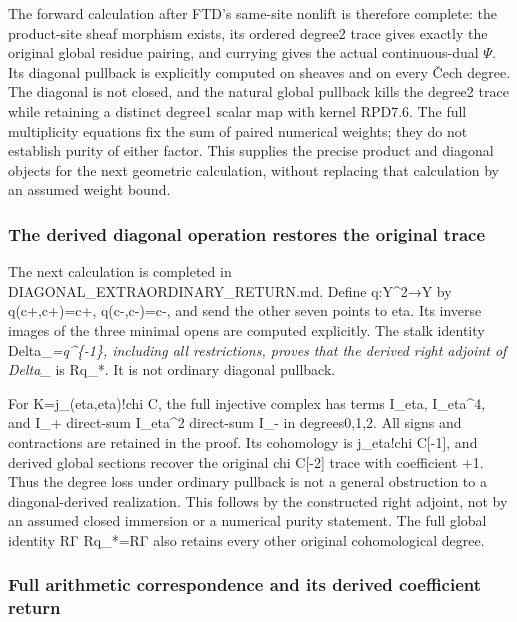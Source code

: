 The forward calculation after FTD's same-site nonlift is therefore
complete: the product-site sheaf morphism exists, its ordered degree2
trace gives exactly the original global residue pairing, and currying
gives the actual continuous-dual \(\Psi\). Its diagonal pullback is
explicitly computed on sheaves and on every Čech degree. The diagonal is
not closed, and the natural global pullback kills the degree2 trace
while retaining a distinct degree1 scalar map with kernel RPD7.6. The
full multiplicity equations fix the sum of paired numerical weights;
they do not establish purity of either factor. This supplies the precise
product and diagonal objects for the next geometric calculation, without
replacing that calculation by an assumed weight bound.

\subsubsection{The derived diagonal operation restores the original
trace}\label{the-derived-diagonal-operation-restores-the-original-trace}

The next calculation is completed in DIAGONAL\_EXTRAORDINARY\_RETURN.md.
Define q:Y\^{}2→Y by q(c+,c+)=c+, q(c-,c-)=c-, and send the other seven
points to eta. Its inverse images of the three minimal opens are
computed explicitly. The stalk identity Delta\_\emph{=q\^{}\{-1\},
including all restrictions, proves that the derived right adjoint of
Delta\_} is Rq\_*. It is not ordinary diagonal pullback.

For K=j\_(eta,eta)!chi C, the full injective complex has terms I\_eta,
I\_eta\^{}4, and I\_+ direct-sum I\_eta\^{}2 direct-sum I\_- in
degrees0,1,2. All signs and contractions are retained in the proof. Its
cohomology is j\_eta!chi C{[}-1{]}, and derived global sections recover
the original chi C{[}-2{]} trace with coefficient +1. Thus the degree
loss under ordinary pullback is not a general obstruction to a
diagonal-derived realization. This follows by the constructed right
adjoint, not by an assumed closed immersion or a numerical purity
statement. The full global identity RΓ Rq\_*=RΓ also retains every other
original cohomological degree.

\subsubsection{Full arithmetic correspondence and its derived
coefficient
return}\label{full-arithmetic-correspondence-and-its-derived-coefficient-return}

